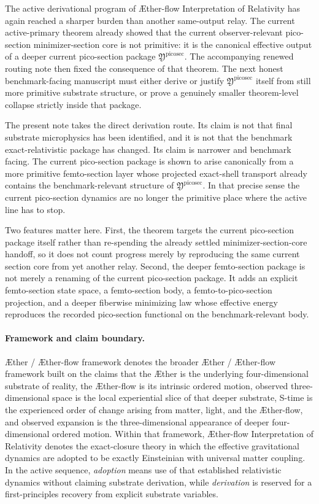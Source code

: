 \documentclass[11pt]{article}
\newcommand{\Aether}{\AE{}ther}
\newcommand{\Aflow}{\AE{}ther-flow}
\newcommand{\TheoryName}{\Aflow{} Interpretation of Relativity}
\newcommand{\TheoryProgram}{\Aether{} / \Aflow{} framework}
\newcommand{\PicoSectionPackage}{\mathfrak Y^{\mathrm{picosec}}}
\begin{document}
The active derivational program of \TheoryName{} has again reached a sharper burden than another same-output relay. The current active-primary theorem already showed that the current observer-relevant pico-section minimizer-section core is not primitive: it is the canonical effective output of a deeper current pico-section package \(\PicoSectionPackage\). The accompanying renewed routing note then fixed the consequence of that theorem. The next honest benchmark-facing manuscript must either derive or justify \(\PicoSectionPackage\) itself from still more primitive substrate structure, or prove a genuinely smaller theorem-level collapse strictly inside that package.

The present note takes the direct derivation route. Its claim is not that final substrate microphysics has been identified, and it is not that the benchmark exact-relativistic package has changed. Its claim is narrower and benchmark facing. The current pico-section package is shown to arise canonically from a more primitive femto-section layer whose projected exact-shell transport already contains the benchmark-relevant structure of \(\PicoSectionPackage\). In that precise sense the current pico-section dynamics are no longer the primitive place where the active line has to stop.

Two features matter here. First, the theorem targets the current pico-section package itself rather than re-spending the already settled minimizer-section-core handoff, so it does not count progress merely by reproducing the same current section core from yet another relay. Second, the deeper femto-section package is not merely a renaming of the current pico-section package. It adds an explicit femto-section state space, a femto-section body, a femto-to-pico-section projection, and a deeper fiberwise minimizing law whose effective energy reproduces the recorded pico-section functional on the benchmark-relevant body.

\paragraph{Framework and claim boundary.}
\TheoryProgram{} denotes the broader \Aether{} / \Aflow{} framework built on the claims that the \Aether{} is the underlying four-dimensional substrate of reality, the \Aflow{} is its intrinsic ordered motion, observed three-dimensional space is the local experiential slice of that deeper substrate, S-time is the experienced order of change arising from matter, light, and the \Aflow{}, and observed expansion is the three-dimensional appearance of deeper four-dimensional ordered motion. Within that framework, \TheoryName{} denotes the exact-closure theory in which the effective gravitational dynamics are adopted to be exactly Einsteinian with universal matter coupling. In the active sequence, \emph{adoption} means use of that established relativistic dynamics without claiming substrate derivation, while \emph{derivation} is reserved for a first-principles recovery from explicit substrate variables.
\end{document}

